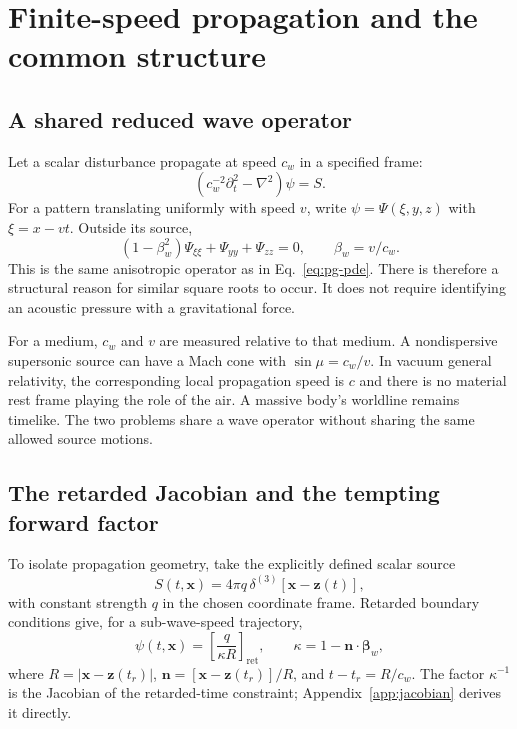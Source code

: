 \documentclass[11pt,a4paper]{article}
\numberwithin{equation}{section}
\newcommand{\ret}{\mathrm{ret}}
\begin{document}
\section{Finite-speed propagation and the common structure}
\label{sec:scalar}

\subsection{A shared reduced wave operator}

Let a scalar disturbance propagate at speed $c_w$ in a specified frame:
\begin{equation}
 \left(c_w^{-2}\partial_t^2-\nabla^2\right)\psi=S.
 \label{eq:wave}
\end{equation}
For a pattern translating uniformly with speed $v$, write
$\psi=\Psi(\xi,y,z)$ with $\xi=x-vt$. Outside its source,
\begin{equation}
 (1-\beta_w^2)\Psi_{\xi\xi}+\Psi_{yy}+\Psi_{zz}=0,
 \qquad \beta_w=v/c_w.
 \label{eq:reduced-wave}
\end{equation}
This is the same anisotropic operator as in Eq.~\eqref{eq:pg-pde}. There is therefore a structural reason for similar square roots to occur. It does not require identifying an acoustic pressure with a gravitational force.

For a medium, $c_w$ and $v$ are measured relative to that medium. A nondispersive supersonic source can have a Mach cone with $\sin\mu=c_w/v$. In vacuum general relativity, the corresponding local propagation speed is $c$ and there is no material rest frame playing the role of the air. A massive body's worldline remains timelike. The two problems share a wave operator without sharing the same allowed source motions.

\subsection{The retarded Jacobian and the tempting forward factor}

To isolate propagation geometry, take the explicitly defined scalar source
\begin{equation}
 S(t,\bm x)=4\pi q\,\delta^{(3)}[\bm x-\bm z(t)],
 \label{eq:scalar-source}
\end{equation}
with constant strength $q$ in the chosen coordinate frame. Retarded boundary conditions give, for a sub-wave-speed trajectory,
\begin{equation}
 \psi(t,\bm x)=\left[\frac{q}{\kappa R}\right]_{\ret},
 \qquad \kappa=1-\bm n\cdot\bm\beta_w,
 \label{eq:lw-scalar}
\end{equation}
where $R=|\bm x-\bm z(t_r)|$, $\bm n=[\bm x-\bm z(t_r)]/R$, and $t-t_r=R/c_w$. The factor $\kappa^{-1}$ is the Jacobian of the retarded-time constraint; Appendix~\ref{app:jacobian} derives it directly.
\end{document}

